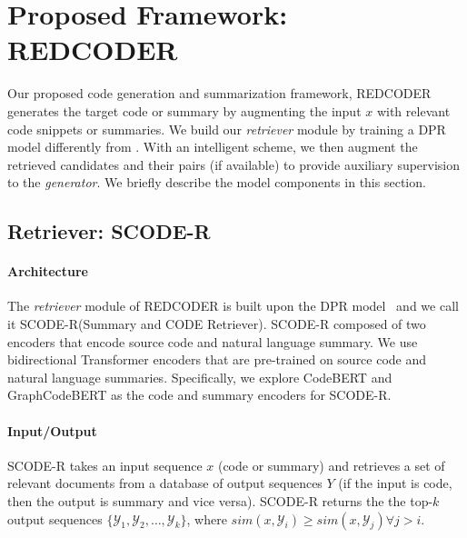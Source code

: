 \documentclass[11pt]{article}
\newcommand{\tool}{{REDCODER}\xspace}
\newcommand{\coder}{SCODE-R\xspace}
\begin{document}
\section{Proposed Framework: \tool}
\label{sec:method}
Our proposed code generation and summarization framework, \tool
generates the target code or summary by augmenting the input $x$ with relevant code snippets or summaries. We build our {\em retriever} module by training a DPR model differently from \cite{karpukhin-etal-2020-dense}. With an intelligent scheme, we then augment the retrieved candidates and their pairs (if available) to  provide auxiliary supervision to the {\em generator}.  
We briefly describe the model components in this section.






\subsection{Retriever: \coder}
\label{sec:method:ret}
\paragraph{Architecture}
The {\em retriever} module of \tool is built upon the DPR model~\cite{karpukhin-etal-2020-dense} and we call it \coder (Summary and CODE Retriever). 
\coder composed of two encoders that encode source code and natural language summary.
We use bidirectional Transformer encoders \cite{vaswani2017attention} that are pre-trained on source code and natural language summaries.
Specifically, we explore CodeBERT \cite{feng-etal-2020-codebert} and GraphCodeBERT \cite{guo2020graphcodebert} as the code and summary encoders for \coder.







\paragraph{Input/Output} 


\coder takes an input sequence $x$ (code or summary) and retrieves a set of relevant documents from a database of output sequences $Y$ (if the input is code, then the output is summary and vice versa).
\coder returns the the top-$k$ output sequences $\{\mathcal{Y}_{1}, \mathcal{Y}_{2}, \ldots , \mathcal{Y}_{k}\}$, where $sim(x, \mathcal{Y}_{i}) \geq sim(x, \mathcal{Y}_{j}) \forall j>i$.
\end{document}
